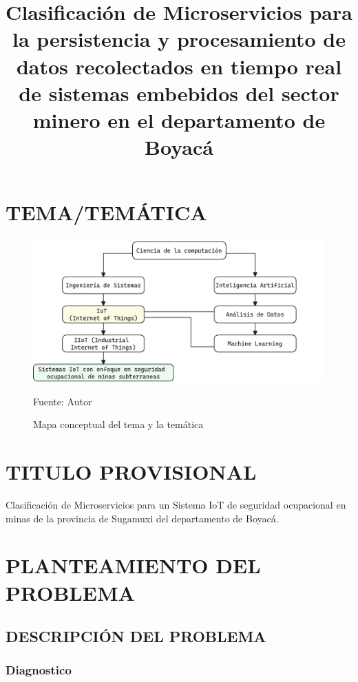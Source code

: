 \documentclass[stu,12pt,floatsintext]{apa7}
\title{Clasificación de Microservicios para la persistencia y procesamiento de datos recolectados en tiempo real de sistemas embebidos del sector minero en el departamento de Boyacá}
\begin{document}
	\maketitle
	\graphicspath{{./images/}}
	\renewcommand\contentsname{TABLA DE CONTENIDO}
	\tableofcontents
	
	\renewcommand\listfigurename{TABLA DE FIGURAS}
	\listoffigures
	\section{TEMA/TEMÁTICA}
	
	\begin{figure}[H]
		\centering
		\includegraphics[scale=0.6]{mapa-conceptual}
		\captionsetup{justification=centering}
		\caption{Mapa conceptual del tema y la temática}
		\small
		Fuente: Autor
	\end{figure}
	\section{TITULO PROVISIONAL}
	Clasificación de Microservicios para un Sistema IoT de seguridad ocupacional en minas de la provincia de Sugamuxi del departamento de Boyacá.
	
	\section{PLANTEAMIENTO DEL PROBLEMA}
	\subsection{DESCRIPCIÓN DEL PROBLEMA}
	\subsubsection{Diagnostico}
	
\end{document}
